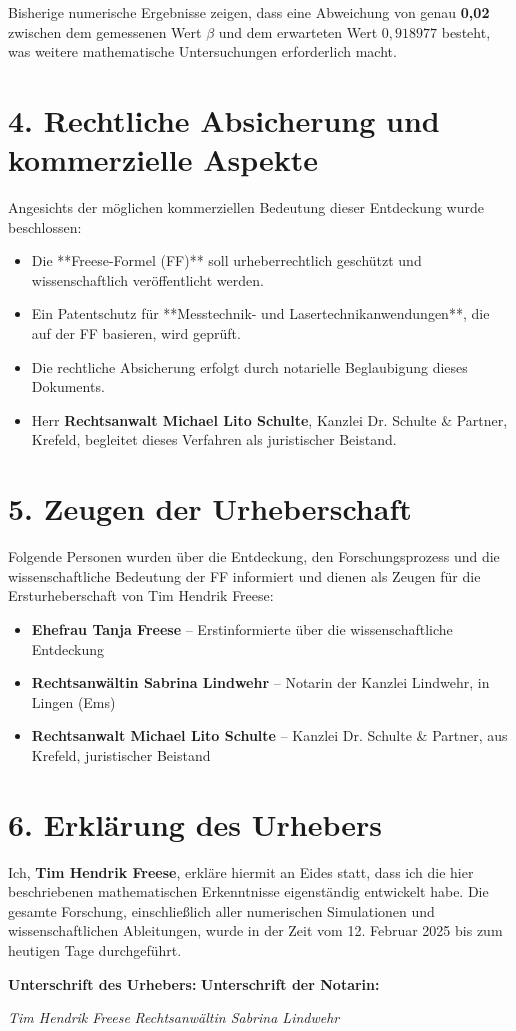 \documentclass[a4paper,12pt]{article}
\begin{document}
Bisherige numerische Ergebnisse zeigen, dass eine Abweichung von genau \textbf{0,02} zwischen dem gemessenen Wert $\beta$ und dem erwarteten Wert $0,918977$ besteht, was weitere mathematische Untersuchungen erforderlich macht.

\section*{4. Rechtliche Absicherung und kommerzielle Aspekte}
Angesichts der möglichen kommerziellen Bedeutung dieser Entdeckung wurde beschlossen:
\begin{itemize}
    \item Die **Freese-Formel (FF)** soll urheberrechtlich geschützt und wissenschaftlich veröffentlicht werden.
    \item Ein Patentschutz für **Messtechnik- und Lasertechnikanwendungen**, die auf der FF basieren, wird geprüft.
    \item Die rechtliche Absicherung erfolgt durch notarielle Beglaubigung dieses Dokuments.
    \item Herr \textbf{Rechtsanwalt Michael Lito Schulte}, Kanzlei Dr. Schulte \& Partner, Krefeld, begleitet dieses Verfahren als juristischer Beistand.
\end{itemize}

\section*{5. Zeugen der Urheberschaft}
Folgende Personen wurden über die Entdeckung, den Forschungsprozess und die wissenschaftliche Bedeutung der FF informiert und dienen als Zeugen für die Ersturheberschaft von Tim Hendrik Freese:

\begin{itemize}
    \item \textbf{Ehefrau Tanja Freese} – Erstinformierte über die wissenschaftliche Entdeckung
    \item \textbf{Rechtsanwältin Sabrina Lindwehr} – Notarin der Kanzlei Lindwehr, in
    Lingen (Ems)
    \item \textbf{Rechtsanwalt Michael Lito Schulte} – Kanzlei Dr. Schulte \& Partner, aus Krefeld, juristischer Beistand
\end{itemize}

\section*{6. Erklärung des Urhebers}
Ich, \textbf{Tim Hendrik Freese}, erkläre hiermit an Eides statt, dass ich die hier beschriebenen mathematischen Erkenntnisse eigenständig entwickelt habe. Die gesamte Forschung, einschließlich aller numerischen Simulationen und wissenschaftlichen Ableitungen, wurde in der Zeit vom 12. Februar 2025 bis zum heutigen Tage durchgeführt.

\vspace{1.5cm}
\textbf{Unterschrift des Urhebers:} \hfill \textbf{Unterschrift der Notarin:}

\vspace{1cm}
\textit{Tim Hendrik Freese} \hfill \textit{Rechtsanwältin Sabrina Lindwehr}
\end{document}
